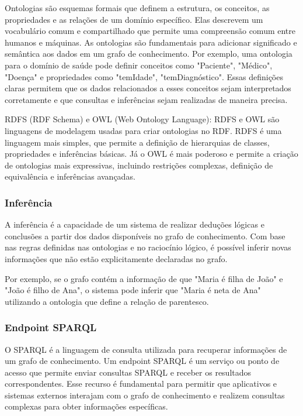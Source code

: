 Ontologias são esquemas formais que definem a estrutura, os conceitos, as propriedades e as relações de um domínio específico. Elas descrevem um vocabulário comum e compartilhado que permite uma compreensão comum entre humanos e máquinas. As ontologias são fundamentais para adicionar significado e semântica aos dados em um grafo de conhecimento.
Por exemplo, uma ontologia para o domínio de saúde pode definir conceitos como "Paciente", "Médico", "Doença" e propriedades como "temIdade", "temDiagnóstico". Essas definições claras permitem que os dados relacionados a esses conceitos sejam interpretados corretamente e que consultas e inferências sejam realizadas de maneira precisa.

RDFS (RDF Schema) e OWL (Web Ontology Language):
RDFS e OWL são linguagens de modelagem usadas para criar ontologias no RDF. RDFS é uma linguagem mais simples, que permite a definição de hierarquias de classes, propriedades e inferências básicas. Já o OWL é mais poderoso e permite a criação de ontologias mais expressivas, incluindo restrições complexas, definição de equivalência e inferências avançadas.

\subsubsection{Inferência}

A inferência é a capacidade de um sistema de realizar deduções lógicas e conclusões a partir dos dados disponíveis no grafo de conhecimento. Com base nas regras definidas nas ontologias e no raciocínio lógico, é possível inferir novas informações que não estão explicitamente declaradas no grafo.

Por exemplo, se o grafo contém a informação de que "Maria é filha de João" e "João é filho de Ana", o sistema pode inferir que "Maria é neta de Ana" utilizando a ontologia que define a relação de parentesco.

\subsubsection{Endpoint SPARQL}

O SPARQL é a linguagem de consulta utilizada para recuperar informações de um grafo de conhecimento. Um endpoint SPARQL é um serviço ou ponto de acesso que permite enviar consultas SPARQL e receber os resultados correspondentes.
Esse recurso é fundamental para permitir que aplicativos e sistemas externos interajam com o grafo de conhecimento e realizem consultas complexas para obter informações específicas.

